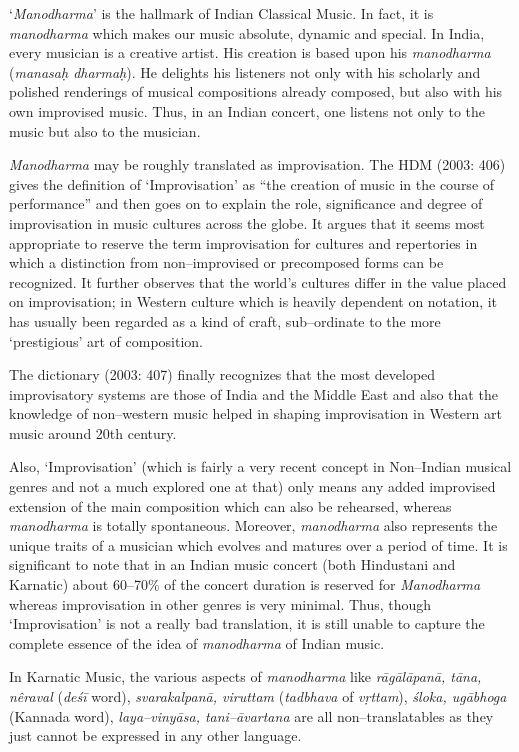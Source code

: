 ‘\textit{Manodharma}’ is the hallmark of Indian Classical Music. In fact, it is \textit{manodharma} which makes our music absolute, dynamic and special. In India, every musician is a creative artist. His creation is based upon his \textit{manodharma} (\textit{manasaḥ dharmaḥ}). He delights his listeners not only with his scholarly and polished renderings of musical compositions already composed, but also with his own improvised music. Thus, in an Indian concert, one listens not only to the music but also to the musician.

\textit{Manodharma} may be roughly translated as improvisation. The HDM (2003: 406) gives the definition of ‘Improvisation’ as “the creation of music in the course of performance” and then goes on to explain the role, significance and degree of improvisation in music cultures across the globe. It argues that it seems most appropriate to reserve the term improvisation for cultures and repertories in which a distinction from non–improvised or precomposed forms can be recognized. It further observes that the world’s cultures differ in the value placed on improvisation; in Western culture which is heavily dependent on notation, it has usually been regarded as a kind of craft, sub–ordinate to the more ‘prestigious’ art of composition.

The dictionary (2003: 407) finally recognizes that the most developed improvisatory systems are those of India and the Middle East and also that the knowledge of non–western music helped in shaping improvisation in Western art music around 20th century.

Also, ‘Improvisation’ (which is fairly a very recent concept in Non–Indian musical genres and not a much explored one at that) only means any added improvised extension of the main composition which can also be rehearsed, whereas \textit{manodharma} is totally spontaneous. Moreover, \textit{manodharma} also represents the unique traits of a musician which evolves and matures over a period of time. It is significant to note that in an Indian music concert (both Hindustani and Karnatic) about 60–70\% of the concert duration is reserved for \textit{Manodharma} whereas improvisation in other genres is very minimal. Thus, though ‘Improvisation’ is not a really bad translation, it is still unable to capture the complete essence of the idea of \textit{manodharma} of Indian music.

In Karnatic Music, the various aspects of \textit{manodharma} like \textit{rāgālāpanā, tāna, nêraval} (\textit{deśī} word), \textit{svarakalpanā, viruttam} (\textit{tadbhava} of \textit{vṛttam}), \textit{śloka, ugābhoga} (Kannada word), \textit{laya–vinyāsa, tani–āvartana} are all non–translatables as they just cannot be expressed in any other language.


